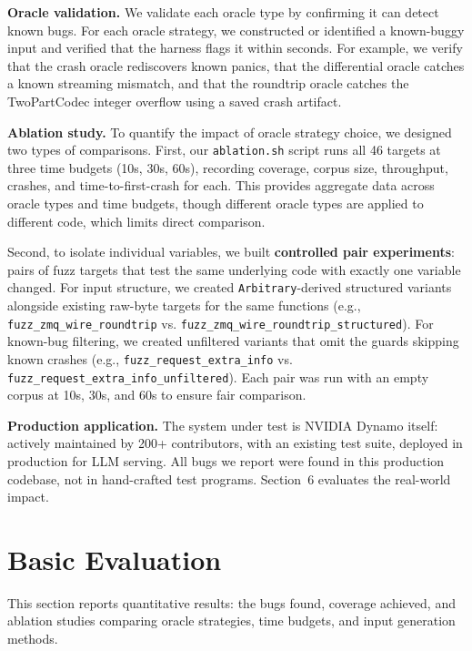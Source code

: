 \documentclass[11pt]{article}
\begin{document}
\textbf{Oracle validation.} We validate each oracle type by confirming it can detect known bugs. For each oracle strategy, we constructed or identified a known-buggy input and verified that the harness flags it within seconds. For example, we verify that the crash oracle rediscovers known panics, that the differential oracle catches a known streaming mismatch, and that the roundtrip oracle catches the TwoPartCodec integer overflow using a saved crash artifact.

\textbf{Ablation study.} To quantify the impact of oracle strategy choice, we designed two types of comparisons. First, our \texttt{ablation.sh} script runs all 46 targets at three time budgets (10s, 30s, 60s), recording coverage, corpus size, throughput, crashes, and time-to-first-crash for each. This provides aggregate data across oracle types and time budgets, though different oracle types are applied to different code, which limits direct comparison.

Second, to isolate individual variables, we built \textbf{controlled pair experiments}: pairs of fuzz targets that test the same underlying code with exactly one variable changed. For input structure, we created \texttt{Arbitrary}-derived structured variants alongside existing raw-byte targets for the same functions (e.g., \texttt{fuzz\_zmq\_wire\_roundtrip} vs. \texttt{fuzz\_zmq\_wire\_roundtrip\_structured}). For known-bug filtering, we created unfiltered variants that omit the guards skipping known crashes (e.g., \texttt{fuzz\_request\_extra\_info} vs. \texttt{fuzz\_request\_extra\_info\_unfiltered}). Each pair was run with an empty corpus at 10s, 30s, and 60s to ensure fair comparison.

\textbf{Production application.} The system under test is NVIDIA Dynamo itself: actively maintained by 200+ contributors, with an existing test suite, deployed in production for LLM serving. All bugs we report were found in this production codebase, not in hand-crafted test programs. Section~6 evaluates the real-world impact.

\section{Basic Evaluation}

This section reports quantitative results: the bugs found, coverage achieved, and ablation studies comparing oracle strategies, time budgets, and input generation methods.
\end{document}
